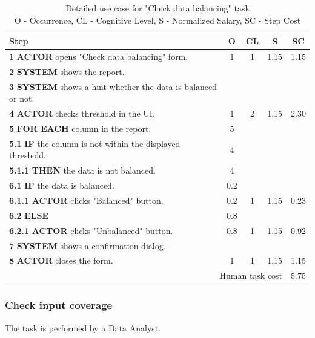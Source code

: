 \begin{table}[H]
\centering
\begin{tabularx}{\textwidth}{|X|c|c|c|c|}
\hline
\textbf{Step} & \textbf{O} & \textbf{CL} & \textbf{S} & \textbf{SC} \\
\hline
\textbf{1} \textbf{ACTOR} opens "Check data balancing" form. & 1 & 1 & 1.15 & 1.15 \\
\hline
\textbf{2} \textbf{SYSTEM} shows the report. & & & & \\
\hline
\textbf{3} \textbf{SYSTEM} shows a hint whether the data is balanced or not. & & & & \\
\hline
\textbf{4} \textbf{ACTOR} checks threshold in the UI. & 1 & 2 & 1.15 & 2.30 \\
\hline
\textbf{5} \textbf{FOR EACH} column in the report: & 5 & & & \\
\hline
\textbf{5.1} \textbf{IF} the column is not within the displayed threshold. & 4 & & & \\
\hline
\textbf{5.1.1} \textbf{THEN} the data is not balanced. & 4 & & & \\
\hline
\textbf{6.1} \textbf{IF} the data is balanced. & 0.2 & & & \\
\hline
\textbf{6.1.1} \textbf{ACTOR} clicks "Balanced" button. & 0.2 & 1 & 1.15 & 0.23 \\
\hline
\textbf{6.2} \textbf{ELSE} & 0.8 & & & \\
\hline
\textbf{6.2.1} \textbf{ACTOR} clicks "Unbalanced" button. & 0.8 & 1 & 1.15 & 0.92 \\
\hline
\textbf{7} \textbf{SYSTEM} shows a confirmation dialog. & & & & \\
\hline
\textbf{8} \textbf{ACTOR} closes the form. & 1 & 1 & 1.15 & 1.15 \\
\hline
\multicolumn{4}{|r|}{Human task cost} & 5.75 \\
\hline
\end{tabularx}
\caption{Detailed use case for "Check data balancing" task\\ 
 O - Occurrence, CL - Cognitive Level, S - Normalized Salary, SC - Step Cost}
\label{table:check_data_balancing}
\end{table}

\subsubsection{Check input coverage}

The task is performed by a Data Analyst.

